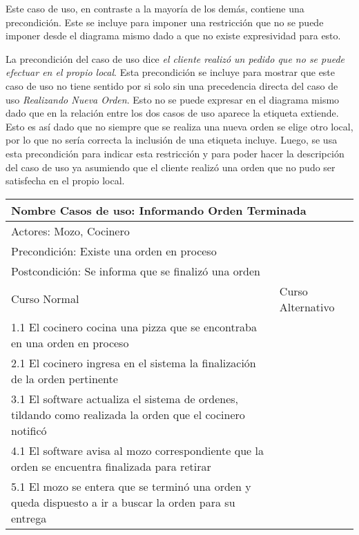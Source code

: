 \documentclass[a4paper,10pt]{article}
\begin{document}
Este caso de uso, en contraste a la mayor\'ia de los dem\'as, contiene una precondici\'on. Este se incluye para imponer una restricci\'on que no
se puede imponer desde el diagrama mismo dado a que no existe expresividad para esto. 

La precondici\'on del caso de uso dice \emph{el cliente realiz\'o un pedido que no se puede efectuar en el propio local}.
Esta precondici\'on se incluye para mostrar que este caso de uso no tiene sentido por si solo sin una precedencia directa del caso de uso
\emph{Realizando Nueva Orden}. Esto no se puede expresar en el diagrama mismo dado que  en la relaci\'on entre los dos casos de uso 
aparece la etiqueta extiende. Esto es as\'i dado que no siempre que se realiza una nueva orden se elige otro local, por lo que no ser\'ia correcta
la inclusi\'on de una etiqueta incluye. Luego, se usa esta precondici\'on para indicar esta restricci\'on y para poder hacer la descripci\'on del caso de uso
ya asumiendo que el cliente realiz\'o una orden que no pudo ser satisfecha en el propio local.

\bigskip

\begin{center}
\begin{tabularx}{14cm}{|X|X|}
\hline
\multicolumn{2}{|l|}{Nombre Casos de uso: Informando Orden Terminada}\\
\hline
\multicolumn{2}{|l|}{Actores: Mozo, Cocinero}\\
\hline
\multicolumn{2}{|l|}{Precondici\'on: Existe una orden en proceso}\\
\hline
\multicolumn{2}{|l|}{Postcondici\'on: Se informa que se finaliz\'o una orden}\\
\hline
Curso Normal & Curso Alternativo\\
\hline
1.1 El cocinero cocina una pizza que se encontraba en una orden en proceso & 
\\
\hline
2.1 El cocinero ingresa en el sistema la finalizaci\'on de la orden pertinente & 
\\
\hline
3.1 El software actualiza el sistema de ordenes, tildando como realizada la orden que el cocinero notific\'o &
\\
\hline
4.1 El software avisa al mozo correspondiente que la orden se encuentra finalizada para retirar &
\\
\hline
5.1 El mozo se entera que se termin\'o una orden y queda dispuesto a ir a buscar la orden para su entrega &
\\
\hline
\end{tabularx}
\end{center}
\end{document}
